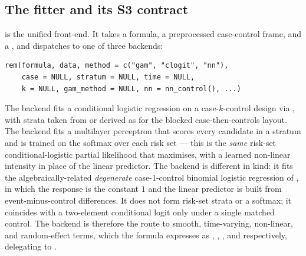 \subsection{The  fitter and its S3 contract}
\label{sec:software-rem}

 is the unified front-end. It takes a formula, a preprocessed
case-control  frame, and a , and dispatches to one of
three backends:

\begin{verbatim}
rem(formula, data, method = c("gam", "clogit", "nn"),
    case = NULL, stratum = NULL, time = NULL,
    k = NULL, gam_method = NULL, nn = nn_control(), ...)
\end{verbatim}

The  backend fits a conditional logistic regression on a
case-\(k\)-control design via , with strata taken from
 or derived as  for the blocked
case-then-controls layout. The  backend fits a multilayer perceptron
that scores every candidate in a stratum and is trained on the softmax over each
risk set --- this is the \emph{same} risk-set conditional-logistic partial
likelihood that  maximises, with a learned non-linear intensity in
place of the linear predictor. The  backend is different in kind: it
fits the algebraically-related \emph{degenerate} case-1-control binomial
logistic regression of \citet{boschi2025rhem}, in which the response is the
constant \(1\) and the linear predictor is built from event-minus-control
differences. It does not form risk-set strata or a softmax; it coincides with a
two-element conditional logit only under a single matched control. The
 backend is therefore the route to smooth, time-varying, non-linear,
and random-effect terms, which the formula expresses as ,
, , and  respectively, delegating to
.

